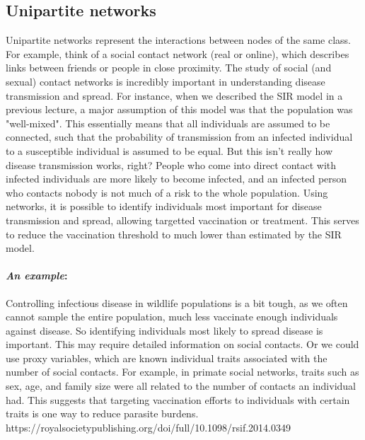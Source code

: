 \documentclass[12pt]{article}
\begin{document}
\bigskip
\subsection*{Unipartite networks}

Unipartite networks represent the interactions between nodes of the same class. For example, think of a social contact network (real or online), which describes links between friends or people in close proximity. The study of social (and sexual) contact networks is incredibly important in understanding disease transmission and spread. For instance, when we described the SIR model in a previous lecture, a major assumption of this model was that the population was "well-mixed". This essentially means that all individuals are assumed to be connected, such that the probability of transmission from an infected individual to a susceptible individual is assumed to be equal. But this isn't really how disease transmission works, right? People who come into direct contact with infected individuals are more likely to become infected, and an infected person who contacts nobody is not much of a risk to the whole population. Using networks, it is possible to identify individuals most important for disease transmission and spread, allowing targetted vaccination or treatment. This serves to reduce the vaccination threshold to much lower than estimated by the SIR model. 



\paragraph*{\textit{An example}:} Controlling infectious disease in wildlife populations is a bit tough, as we often cannot sample the entire population, much less vaccinate enough individuals against disease. So identifying individuals most likely to spread disease is important. This may require detailed information on social contacts. Or we could use proxy variables, which are known individual traits associated with the number of social contacts. For example, in primate social networks, traits such as sex, age, and family size were all related to the number of contacts an individual had. This suggests that targeting vaccination efforts to individuals with certain traits is one way to reduce parasite burdens. \\
https://royalsocietypublishing.org/doi/full/10.1098/rsif.2014.0349
\end{document}

